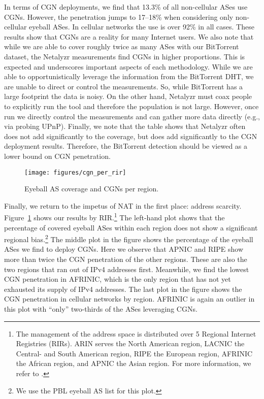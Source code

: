 \documentclass[10pt]{sig-alternate-05-2015}
\newcommand{\neta}{Netalyzr\xspace}
\begin{document}
In terms of CGN deployments, we find that 13.3\% of all non-cellular ASes
use CGNs.  However, the penetration jumps to 17--18\% when
considering only non-cellular eyeball ASes.  In cellular networks
the use is over 92\% in all cases.  These results show that CGNs are
a reality for many Internet users.
We also note that while we are able to cover roughly twice as many
ASes with our BitTorrent dataset, the Netalyzr measurements find
CGNs in higher proportions.  This is expected and underscores
important aspects of each methodology.  While we are able to
opportunistically leverage the information from the BitTorrent DHT,
we are unable to direct or control the measurements.  So, while
BitTorrent has a large footprint the data is noisy.  On the other
hand, \neta must coax people to explicitly run the tool and
therefore the population is not large.  However, once run we
directly control the measurements and can gather more data directly
(e.g., via probing UPnP).  Finally, we note that the table shows
that \neta often does not add significantly to the coverage, but
does add significantly to the CGN deployment results.  Therefore,
the BitTorrent detection should be viewed as a lower bound on CGN
penetration.

\begin{figure}[t]
    \centering
    \texttt{[image: figures/cgn\_per\_rir]}
    \caption{Eyeball AS coverage and CGNs per region.}
    \vspace{-1em}
    \label{fig:cgn_per_region}
\end{figure}

Finally, we return to the impetus of NAT in the first place: address
scarcity.  Figure~\ref{fig:cgn_per_region} shows our results by 
RIR.\footnote{The management of the address space is distributed over 5 
Regional Internet Registries (RIRs). ARIN serves the North American region, 
LACNIC the Central- and South American region, RIPE the European region, 
AFRINIC the African region, and APNIC the Asian region. For more information, 
we refer to \cite{RABP14}.}
The left-hand plot shows that the percentage of covered eyeball ASes
within each region does not show a significant regional
bias.\footnote{We use the PBL eyeball AS list for this plot.}  The
middle plot in the figure shows the percentage of the eyeball ASes
we find to deploy CGNs.  Here we observe that APNIC and RIPE show
more than twice the CGN penetration of the other regions.  These are
also the two regions that ran out of IPv4 addresses first.
Meanwhile, we find the lowest CGN penetration in AFRINIC, which is
the only region that has not yet exhausted its supply of IPv4
addresses.  The last plot in the figure shows the CGN penetration in
cellular networks by region.  AFRINIC is again an outlier in this
plot with ``only'' two-thirds of the ASes leveraging CGNs.
\end{document}
